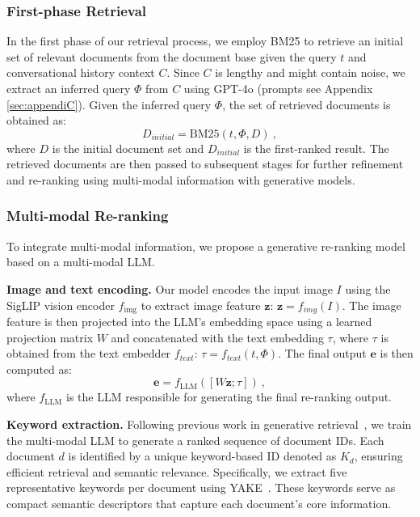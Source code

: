 \documentclass[11pt]{article}
\begin{document}
\subsubsection{First-phase Retrieval}
In the first phase of our retrieval process, we employ BM25 to retrieve an initial set of relevant documents from the document base given the query $t$ and conversational history context $C$. Since \( C \) is lengthy and might contain noise, we extract an inferred query \(\Phi\) from \( C \) using GPT-4o (prompts see Appendix \ref{sec:appendiC}). Given the inferred query \( \Phi\), the set of retrieved documents is obtained as:
\begin{equation}
    D_{initial} = \text{BM25}(t, \Phi, D)~,
\end{equation}
where $D$ is the initial document set and $D_{initial}$ is the first-ranked result. The retrieved documents are then passed to subsequent stages for further refinement and re-ranking using multi-modal information with generative models.


\subsubsection{Multi-modal Re-ranking}
To integrate multi-modal information, we propose a generative re-ranking model based on a multi-modal LLM.

\noindent \textbf{Image and text encoding.}
Our model encodes the input image \( I \) using the SigLIP \cite{siglip} vision encoder $f_{\text{img}}$ to extract image feature $\mathbf{z}$: $\mathbf{z} = f_{img}(I)$. The image feature is then projected into the LLM's embedding space using a learned projection matrix \( W \) and concatenated with the text embedding \(\tau\), where \(\tau\) is obtained from the text embedder $f_{text}$: $\tau=f_{text}(t,\Phi)$. The final output $\mathbf{e}$ is then computed as:
\begin{equation}
    \mathbf{e} = f_{\text{LLM}}([W \mathbf{z}; \tau ])~,
\end{equation}
where \( f_{\text{LLM}} \) is the LLM responsible for generating the final re-ranking output.



\noindent \textbf{Keyword extraction.} 
Following previous work in generative retrieval~\cite{rankedGR,li2023learningrankgenerativeretrieval}, we train the multi-modal LLM to generate a ranked sequence of document IDs. Each document $d$ is identified by a unique keyword-based ID denoted as \( K_d \), ensuring efficient retrieval and semantic relevance. Specifically, we extract five representative keywords per document using YAKE~\cite{YAKE}. These keywords serve as compact semantic descriptors that capture each document's core information. 
\end{document}
